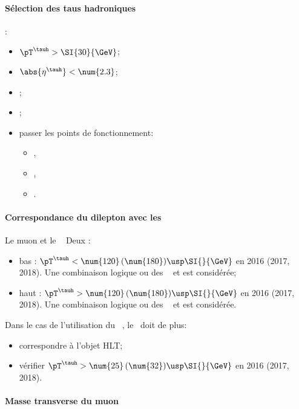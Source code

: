 \paragraph{Sélection des taus hadroniques}
:
\begin{itemize}
    \item $\pT^{\tauh} > \SI{30}{\GeV}$;
    \item $\abs{\eta^{\tauh}} < \num{2.3}$;
    \item \TauHdz;
    \item \NewDecayModeFinding;
    \item passer les points de fonctionnement:
        \begin{itemize}
            \item {},
            \item {},
            \item {}.
        \end{itemize}
\end{itemize}
\paragraph{Correspondance du dilepton avec les \HLTpaths}
Le muon et le \tauh\ \FromPairMatchToHLTObjects{}
Deux \HLTregionsDefined:
\begin{itemize}
    \item bas \pT: $\pT^{\tauh} < \num{120} \, (\num{180}) \usp \SI{}{\GeV}$ en 2016 (2017, 2018).
        Une combinaison logique \og ou \fg{} des \HLTpaths\ \HLTSingleMu{} et \HLTMuTauCross{} est considérée;
    \item haut \pT: $\pT^{\tauh} > \num{120} \, (\num{180}) \usp \SI{}{\GeV}$ en 2016 (2017, 2018).
        Une combinaison logique \og ou \fg{} des \HLTpaths\ \HLTSingleMu{} et \HLTSingleTau{} est considérée.
\end{itemize}
Dans le cas de l'utilisation du \HLTpath\ \HLTMuTauCross{}, le \tauh\ doit de plus:
\begin{itemize}
    \item correspondre à l'objet HLT;
    \item vérifier $\pT^{\tauh} > \num{25} \, (\num{32}) \usp \SI{}{\GeV}$ en 2016 (2017, 2018).
\end{itemize}
\paragraph{Masse transverse du muon}
